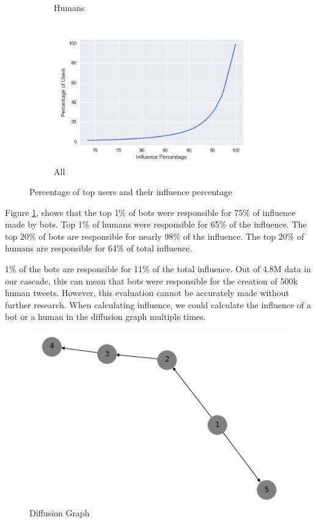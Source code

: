 \documentclass[letterpaper]{article}
\begin{document}
\begin{figure}[H]
\begin{subfigure}[b]{0.4\linewidth}
      \caption{Humans}
    \end{subfigure}
    \begin{subfigure}[b]{0.8\linewidth}
        \includegraphics[width=\linewidth]{images/top_1per_all.png}
        \caption{All}
    \end{subfigure}
    \caption{Percentage of top users and their influence percentage}
    \label{fig:top_infuence}
\end{figure}

Figure \ref{fig:top_infuence}, shows that 
the top 1\% of bots were responsible for 75\% of influence made by bots. Top 1\% of humans were responsible for 65\% of the influence. The top 20\% of bots are responsible for nearly 98\% of the influence. The top 20\% of humans are responsible for 64\% of total influence. \par

1\% of the bots are responsible for 11\% of the total influence. Out of 4.8M data in our cascade, this can mean that
bots were responsible for the creation of 500k human tweets. However, this evaluation cannot be accurately made without further research. 
When calculating influence, we could calculate the influence of a bot or a human in the diffusion graph multiple times.

\begin{figure}[h!]
    \includegraphics[width=\linewidth]{images/diffusion_graph.png}
    \caption{Diffusion Graph}
    \label{fig:diff_graph}
\end{figure}
\end{document}
